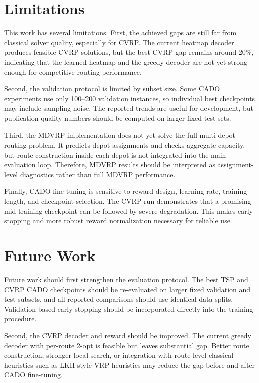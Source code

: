 \section{Limitations}
\label{sec:limitations}

This work has several limitations. First, the achieved gaps are still far from classical solver quality, especially for CVRP. The current heatmap decoder produces feasible CVRP solutions, but the best CVRP gap remains around 20\%, indicating that the learned heatmap and the greedy decoder are not yet strong enough for competitive routing performance.

Second, the validation protocol is limited by subset size. Some CADO experiments use only 100--200 validation instances, so individual best checkpoints may include sampling noise. The reported trends are useful for development, but publication-quality numbers should be computed on larger fixed test sets.

Third, the MDVRP implementation does not yet solve the full multi-depot routing problem. It predicts depot assignments and checks aggregate capacity, but route construction inside each depot is not integrated into the main evaluation loop. Therefore, MDVRP results should be interpreted as assignment-level diagnostics rather than full MDVRP performance.

Finally, CADO fine-tuning is sensitive to reward design, learning rate, training length, and checkpoint selection. The CVRP run demonstrates that a promising mid-training checkpoint can be followed by severe degradation. This makes early stopping and more robust reward normalization necessary for reliable use.

\section{Future Work}
\label{sec:future-work}

Future work should first strengthen the evaluation protocol. The best TSP and CVRP CADO checkpoints should be re-evaluated on larger fixed validation and test subsets, and all reported comparisons should use identical data splits. Validation-based early stopping should be incorporated directly into the training procedure.

Second, the CVRP decoder and reward should be improved. The current greedy decoder with per-route 2-opt is feasible but leaves substantial gap. Better route construction, stronger local search, or integration with route-level classical heuristics such as LKH-style VRP heuristics \citep{helsgaun2017extension} may reduce the gap before and after CADO fine-tuning.

